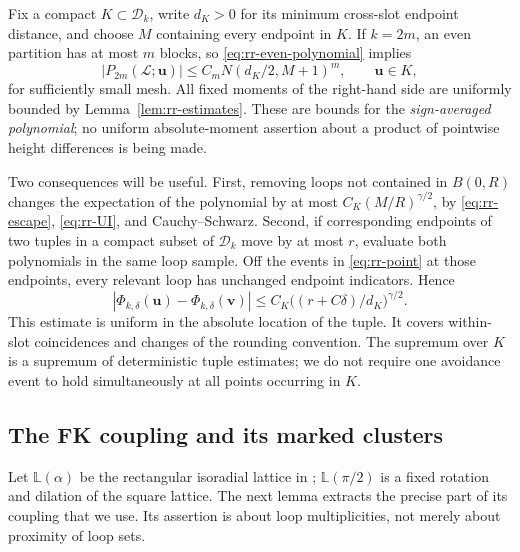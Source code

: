 Fix a compact $K\subset\mathcal D_k$, write $d_K>0$ for its minimum
cross-slot endpoint distance, and choose $M$ containing every
endpoint in $K$.  If $k=2m$, an even partition has at most $m$
blocks, so \eqref{eq:rr-even-polynomial} implies
\begin{equation}
 |P_{2m}(\mathcal L;\boldsymbol u)|
       \le C_m N(d_K/2,M+1)^m,
 \qquad \boldsymbol u\in K,
 \label{eq:rr-UI}
\end{equation}
for sufficiently small mesh.  All fixed moments of the right-hand
side are uniformly bounded by Lemma~\ref{lem:rr-estimates}.  These
are bounds for the \emph{sign-averaged polynomial}; no uniform
absolute-moment assertion about a product of pointwise height
differences is being made.

Two consequences will be useful.  First, removing loops not
contained in $B(0,R)$ changes the expectation of the polynomial by
at most $C_K(M/R)^{\gamma/2}$, by
\eqref{eq:rr-escape}, \eqref{eq:rr-UI}, and Cauchy--Schwarz.
Second, if corresponding endpoints of two tuples in a compact
subset of $\mathcal D_k$ move by at most $r$, evaluate both
polynomials in the same loop sample.  Off the events in
\eqref{eq:rr-point} at those endpoints, every relevant loop has
unchanged endpoint indicators.  Hence
\begin{equation}
 |\Phi_{k,\delta}(\boldsymbol u)
                   -\Phi_{k,\delta}(\boldsymbol v)|
       \le C_K\bigl((r+C\delta)/d_K\bigr)^{\gamma/2}.
 \label{eq:rr-continuity}
\end{equation}
This estimate is uniform in the absolute location of the tuple.
It covers within-slot coincidences and changes of the rounding
convention.  The supremum over $K$ is a supremum of deterministic
tuple estimates; we do not require one avoidance event to hold
simultaneously at all points occurring in $K$.

\subsection{The FK coupling and its marked clusters}

Let $\mathbb L(\alpha)$ be the rectangular isoradial lattice in
\cite[Section~1.4]{DCKKMO2026Rotation};
$\mathbb L(\pi/2)$ is a fixed rotation and dilation of the square
lattice.  The next lemma extracts the precise part of its coupling
that we use.  Its assertion is about loop multiplicities, not merely
about proximity of loop sets.

